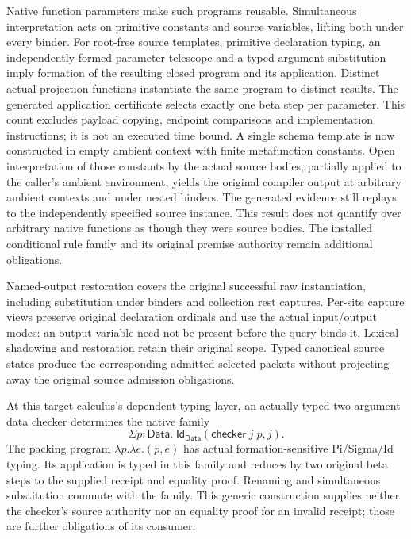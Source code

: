\documentclass[11pt]{article}
\begin{document}
Native function parameters make such programs reusable. Simultaneous
interpretation acts on primitive constants and source variables, lifting both
under every binder. For root-free source templates, primitive declaration
typing, an independently formed parameter telescope and a typed argument
substitution imply formation of the resulting closed program and its
application. Distinct actual projection functions instantiate the same program
to distinct results. The generated application certificate selects exactly one
beta step per parameter. This count excludes payload copying, endpoint
comparisons and implementation instructions; it is not an executed time bound.
A single schema template is now constructed in empty ambient context with
finite metafunction constants. Open interpretation of those constants by the
actual source bodies, partially applied to the caller's ambient environment,
yields the original compiler output at arbitrary ambient contexts and under
nested binders. The generated evidence still replays to the independently
specified source instance. This result does not quantify over arbitrary native
functions as though they were source bodies. The installed conditional rule
family and its original premise authority remain additional obligations.

Named-output restoration covers the original successful raw instantiation,
including substitution under binders and collection rest captures. Per-site
capture views preserve original declaration ordinals and use the actual
input/output modes: an output variable need not be present before the query
binds it. Lexical shadowing and restoration retain their original scope.
Typed canonical source states produce the corresponding admitted selected
packets without projecting away the original source admission obligations.

At this target calculus's dependent typing layer, an actually typed two-argument data checker
determines the native family
\[
 \Sigma p:\mathsf{Data}.\;
 \mathsf{Id}_{\mathsf{Data}}(\mathsf{checker}\;j\;p,j).
\]
The packing program $\lambda p.\lambda e.(p,e)$ has actual formation-sensitive
Pi/Sigma/Id typing. Its application is typed in this family and reduces by
two original beta steps to the supplied receipt and equality proof.
Renaming and simultaneous substitution commute with the family. This generic
construction supplies neither the checker's source authority nor an equality
proof for an invalid receipt; those are further obligations of its consumer.
\end{document}
